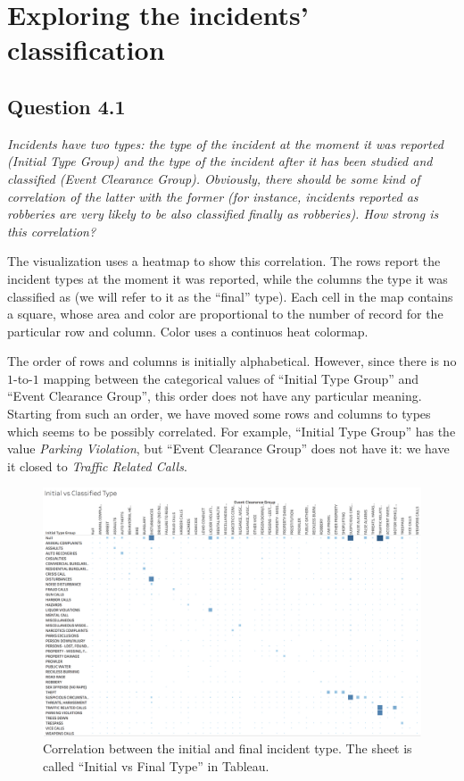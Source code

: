 \section{Exploring the incidents' classification}

\subsection*{Question 4.1}
\textit{Incidents have two types: the type of the incident at the moment it was reported (Initial Type Group) and the type of the incident after it has been studied and classified (Event Clearance Group). Obviously, there should be some kind of correlation of the latter with the former (for instance, incidents reported as robberies are very likely to be also classified finally as robberies). How strong is this correlation?}

The visualization uses a heatmap to show this correlation.
The rows report the incident types at the moment it was reported, while the columns the type it was classified as (we will refer to it as the ``final'' type).
Each cell in the map contains a square, whose area and color are proportional to the number of record for the particular row and column.
Color uses a continuos heat colormap.

The order of rows and columns is initially alphabetical.
However, since there is no $1$-to-$1$ mapping between the categorical values of ``Initial Type Group'' and ``Event Clearance Group'', this order does not have any particular meaning.
Starting from such an order, we have moved some rows and columns to types which seems to be possibly correlated.
For example, ``Initial Type Group'' has the value \textit{Parking Violation}, but ``Event Clearance Group'' does not have it:
we have it closed to \textit{Traffic Related Calls}.

\begin{figure}[h]
	\centering
	\includegraphics[width=\columnwidth]{figures/4_1_initial_vs_final_group_heatmap}
	\caption{Correlation between the initial and final incident type. The sheet is called ``Initial vs Final Type'' in Tableau.}
	\label{fig:4_1_initial_vs_final_group_heatmap}
\end{figure}

